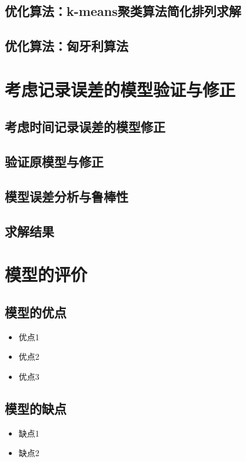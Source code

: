 \documentclass[withoutpreface,bwprint]{cumcmthesis}
\begin{document}
\subsection{优化算法：k-means聚类算法简化排列求解}

\subsection{优化算法：匈牙利算法}



\section{考虑记录误差的模型验证与修正}

\subsection{考虑时间记录误差的模型修正}

\subsection{验证原模型与修正}

\subsection{模型误差分析与鲁棒性}

\subsection{求解结果}



\section{模型的评价}

\subsection{模型的优点}
\begin{itemize}[itemindent=2em]
\item 优点1
\item 优点2
\item 优点3
\end{itemize}

\subsection{模型的缺点}
\begin{itemize}[itemindent=2em]
\item 缺点1
\item 缺点2
\end{itemize}
\end{document}
